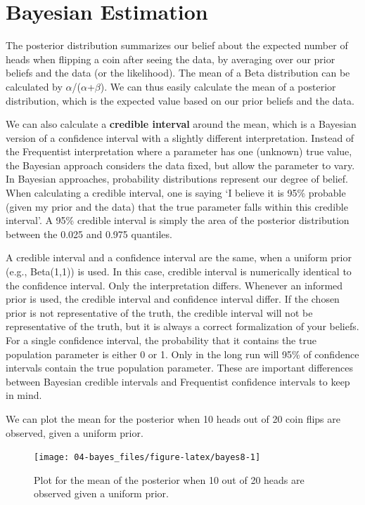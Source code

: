 \documentclass[
]{krantz}
\begin{document}
\hypertarget{bayesest}{%
\section{Bayesian Estimation}\label{bayesest}}

The posterior distribution summarizes our belief about the expected number of heads when flipping a coin after seeing the data, by averaging over our prior beliefs and the data (or the likelihood). The mean of a Beta distribution can be calculated by \(\alpha\)/(\(\alpha\)+\(\beta\)). We can thus easily calculate the mean of a posterior distribution, which is the expected value based on our prior beliefs and the data.

We can also calculate a \textbf{credible interval} around the mean, which is a Bayesian version of a confidence interval with a slightly different interpretation. Instead of the Frequentist interpretation where a parameter has one (unknown) true value, the Bayesian approach considers the data fixed, but allow the parameter to vary. In Bayesian approaches, probability distributions represent our degree of belief. When calculating a credible interval, one is saying `I believe it is 95\% probable (given my prior and the data) that the true parameter falls within this credible interval'. A 95\% credible interval is simply the area of the posterior distribution between the 0.025 and 0.975 quantiles.

A credible interval and a confidence interval are the same, when a uniform prior (e.g., Beta(1,1)) is used. In this case, credible interval is numerically identical to the confidence interval. Only the interpretation differs. Whenever an informed prior is used, the credible interval and confidence interval differ. If the chosen prior is not representative of the truth, the credible interval will not be representative of the truth, but it is always a correct formalization of your beliefs. For a single confidence interval, the probability that it contains the true population parameter is either 0 or 1. Only in the long run will 95\% of confidence intervals contain the true population parameter. These are important differences between Bayesian credible intervals and Frequentist confidence intervals to keep in mind.

We can plot the mean for the posterior when 10 heads out of 20 coin flips are observed, given a uniform prior.

\begin{figure}

{\centering \texttt{[image: 04-bayes\_files/figure-latex/bayes8-1]} 

}

\caption{Plot for the mean of the posterior when 10 out of 20 heads are observed given a uniform prior.}\label{fig:bayes8}
\end{figure}
\end{document}
